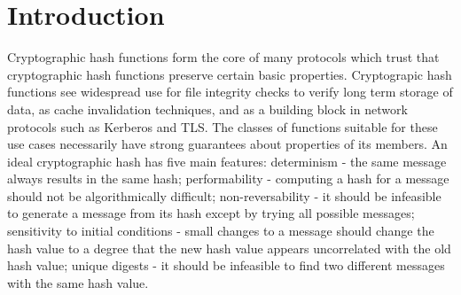 \documentclass[conference]{IEEEtran}
\begin{document}
\maketitle

\begin{abstract}
The discovery of fast collision attacks in cryptographic hash functions has
traditionally resulted in the immediate deprecation of that hash function.
In this paper we propose five scalable and practical metrics for evaluating
the utility of collision classes based on boolean constraints and show that
the published attacks by X. Wang, Y. Sasaki, P. Kasselman, H. Dobbertin, and
M. Schl{\"a}ffer in MD4 have high utility. We expand on existing attacks by
developing a series of techniques based on logical cryptanalysis to find
over 35,000 collisions in MD4 based on existing collisions, through the novel
definition of a collision neighborhood. We demonstrate new techniques for
inductively building full collisions from reduced round variants of MD4. We
propose these techniques as a mechanism for measuring hash trustworthiness and
discuss potential applications to real-world systems.
\end{abstract}

%
\IEEEpeerreviewmaketitle

\section{Introduction}

Cryptographic hash functions form the core of many protocols which
trust that cryptographic hash functions preserve certain basic
properties. Cryptograpic hash functions see widespread
use for file integrity checks to verify long term storage of
data, as cache invalidation techniques, and as a building block in network
protocols such as Kerberos and TLS.  The classes of functions suitable
for these use cases necessarily have
strong guarantees about properties of its members.
An ideal cryptographic hash has five main features: determinism - the
same message always results in the same hash; performability -
computing a hash for a message should not be algorithmically
difficult; non-reversability - it should be infeasible to generate a message
from its hash except by trying all possible messages; sensitivity to
initial conditions - small changes to a message should change the hash
value to a degree that the new hash value appears uncorrelated with
the old hash value; unique digests - it should be infeasible to find
two different messages with the same hash value.
\end{document}
